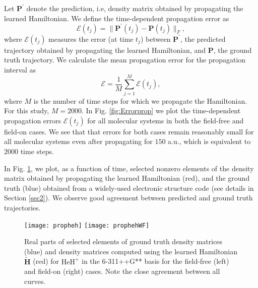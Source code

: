 \documentclass[10pt]{article}
\newcommand{\heh}{\ensuremath{\text{HeH}^+} }
\begin{document}
Let $\mathbf{P^\prime}$ denote the prediction, i.e, density matrix obtained by propagating the learned Hamiltonian. We define the time-dependent propagation error as
\begin{equation}
\mathcal{E }(t_j) = \|\mathbf{P}^\prime (t_j)-\mathbf{P}(t_j) \|_F, 
    \label{eqn:TDproperror}
\end{equation}
where $\mathcal{E }(t_j)$ measures the error (at time $t_j$) between $\mathbf{P}^\prime$, the predicted trajectory obtained by propagating the learned Hamiltonian, and $\mathbf{P}$, the ground truth trajectory. 
We calculate the mean propagation error for the propagation interval as 
\begin{equation}
\mathcal{E} = \frac{1}{M}\sum_{j=1}^{M}\mathcal{E }(t_j),  
    \label{eqn:properror}
\end{equation}
where $M$ is the number of time steps for which we propagate the Hamiltonian. For this study, $M=2000$. In Fig. \ref{fig:Errorprop} we plot the time-dependent propagation errors $\mathcal{E}(t_j)$ for all molecular systems in both the field-free and field-on cases. We see that that errors for both cases remain reasonably small for all molecular systems even after propagating for $150$ a.u., which is equivalent to $2000$ time steps. 

In Fig. \ref{fig4}, we plot, as a function of time, selected nonzero elements of the density matrix obtained by propagating the learned Hamiltonian (red), and the ground truth (blue) obtained from a widely-used electronic structure code (see details in Section \ref{sec2}). We observe good agreement between predicted and ground truth trajectories.
\begin{figure}[htbp]
\begin{center}
\texttt{[image: propheh]}
\texttt{[image: prophehWF]}
\end{center}
\caption{Real parts of selected elements of ground truth density matrices (blue) and density matrices computed using the learned Hamiltonian $\widetilde{\mathbf{H}}$ (red) for \heh in the 6-311++G** basis for the field-free (left) and field-on (right) cases.  Note the close agreement between all curves.\label{fig4}}
\end{figure}

\end{document}

